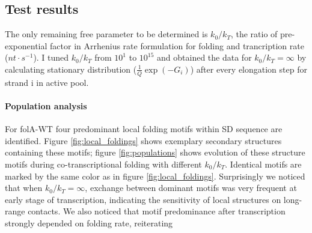 \documentclass[11pt, a4paper]{article}
\begin{document}
\subsection{Test results}

The only remaining free parameter to be determined is $k_0/k_T$, the ratio of pre-exponential factor in Arrhenius rate formulation for folding and trancription rate ($nt\cdot s^{-1}$). I tuned $k_0/k_T$ from $10^{1}$ to $10^{15}$ and obtained the data for $k_0/k_T=\infty$ by calculating stationary distribution ($\frac{1}{Q}\exp(-G_i)$) after every elongation step for strand i in active pool.
 
\paragraph{Population analysis} For folA-WT four predominant local folding motifs within SD sequence are identified. Figure \ref{fig:local_foldings} shows exemplary secondary structures containing these motifs; figure \ref{fig:populations} shows evolution of these structure motifs during co-transcriptional folding with different $k_0/k_T$. Identical motifs are marked by the same color as in figure \ref{fig:local_foldings}. Surprisingly we noticed that when $k_0/k_T=\infty$, exchange between dominant motifs was very frequent at early stage of transcription, indicating the sensitivity of local structures on long-range contacts. We also noticed that motif predominance after transcription strongly depended on folding rate, reiterating
\end{document}

